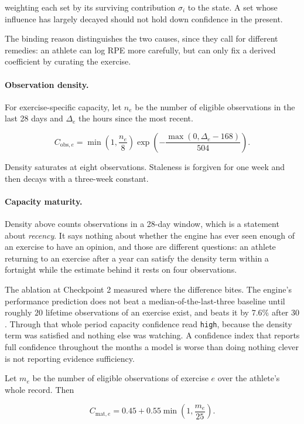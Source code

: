 \documentclass[11pt]{article}
\begin{document}
weighting each set by its surviving contribution $\sigma_i$ to the state. A set whose influence has largely decayed should not hold down confidence in the present.

The binding reason distinguishes the two causes, since they call for different remedies: an athlete can log RPE more carefully, but can only fix a derived coefficient by curating the exercise.

\paragraph{Observation density.} For exercise-specific capacity, let $n_e$ be the number of eligible observations in the last 28 days and $\Delta_e$ the hours since the most recent.

\begin{equation}
C_{\mathrm{obs},e}=\min\!\left(1,\frac{n_e}{8}\right)
\exp\!\left(-\frac{\max(0,\Delta_e-168)}{504}\right).
\end{equation}

Density saturates at eight observations. Staleness is forgiven for one week and then decays with a three-week constant.

\paragraph{Capacity maturity.} Density above counts observations in a 28-day window, which is a statement about \emph{recency}. It says nothing about whether the engine has ever seen enough of an exercise to have an opinion, and those are different questions: an athlete returning to an exercise after a year can satisfy the density term within a fortnight while the estimate behind it rests on four observations.

The ablation at Checkpoint 2 measured where the difference bites. The engine's performance prediction does not beat a median-of-the-last-three baseline until roughly $20$ lifetime observations of an exercise exist, and beats it by $7.6\%$ after $30$. Through that whole period capacity confidence read \texttt{high}, because the density term was satisfied and nothing else was watching. A confidence index that reports full confidence throughout the months a model is worse than doing nothing clever is not reporting evidence sufficiency.

Let $m_e$ be the number of eligible observations of exercise $e$ over the athlete's whole record. Then

\begin{equation}
C_{\mathrm{mat},e}=0.45+0.55\min\!\left(1,\frac{m_e}{25}\right).
\end{equation}
\end{document}
